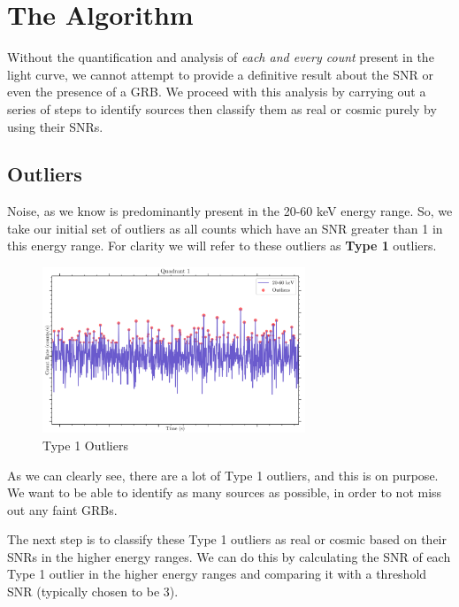 \documentclass[11pt]{book} %
\begin{document}
\chapter{The Algorithm}
Without the quantification and analysis of \textsl{each and every count} present in the light curve, we cannot attempt to provide a definitive result about the SNR or even the presence of a GRB. We proceed with this analysis by carrying out a series of steps to identify sources then classify them as real or cosmic purely by using their SNRs.

\section{Outliers}

Noise, as we know is predominantly present in the 20-60 keV energy range. So, we take our initial set of outliers as all counts which have an SNR greater than 1 in this energy range. For clarity we will refer to these outliers as \textbf{Type 1} outliers.

\begin{figure}[H]
    \centering
    \includegraphics[width=0.7\textwidth]{Pictures/type1.png}
    \caption{Type 1 Outliers}
\end{figure}

\newpage

As we can clearly see, there are a lot of Type 1 outliers, and this is on purpose. We want to be able to identify as many sources as possible, in order to not miss out any faint GRBs. 

The next step is to classify these Type 1 outliers as real or cosmic based on their SNRs in the higher energy ranges. We can do this by calculating the SNR of each Type 1 outlier in the higher energy ranges and comparing it with a threshold SNR (typically chosen to be 3). 
\end{document}
